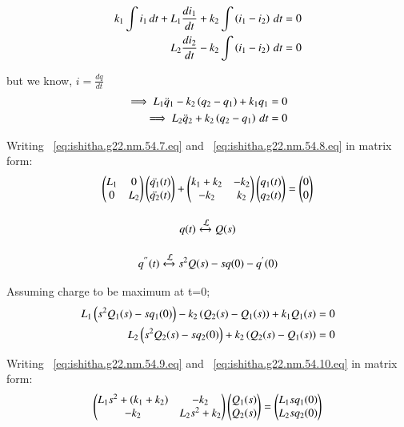 \documentclass[journal,12pt,twocolumn]{IEEEtran}
\theoremstyle{remark}
\begin{document}
\begin{align}
 k_1\int i_1 \, dt + L_1\frac{di_1}{dt}+k_2\int \left(i_1-i_2\right) \, dt &=0
\label{eq:ishitha.g22.nm.54.5.eq} \\
 L_2\frac{di_2}{dt}-k_2\int \left(i_1-i_2\right) \, dt &=0
\label{eq:ishitha.g22.nm.54.6.eq} 
\end{align}

but we know, $i=\frac{dq}{dt}$ 
 \begin{align}
 \implies L_1\ddot q_1 -k_2\left(q_2-q_1\right) + k_1q_1  &=0 
 \label{eq:ishitha.g22.nm.54.7.eq} \\
 \implies L_2\ddot q_2+k_2\left(q_2-q_1\right) \, dt &=0
  \label{eq:ishitha.g22.nm.54.8.eq}
\end{align}  


Writing ~\eqref{eq:ishitha.g22.nm.54.7.eq} and ~\eqref{eq:ishitha.g22.nm.54.8.eq} in matrix form:
\begin{align}
\begin{pmatrix}
L_1 & 0  \\
0 & L_2
\end{pmatrix}
\begin{pmatrix}
\ddot{q_1}(t) \\
\ddot{q_2}(t)
\end{pmatrix}
+
\begin{pmatrix}
k_1+k_2 & -k_2  \\
-k_2 & k_2
\end{pmatrix}
\begin{pmatrix}
q_1(t) \\
q_2(t)
\end{pmatrix}
=
\begin{pmatrix}
0 \\
0
\end{pmatrix}
\end{align}

\begin{equation}
q(t)     \stackrel{}{\xleftrightarrow{\mathcal{L}}}   Q(s)  
\end{equation}


\begin{equation}
q^{''}(t) \stackrel{}{\xleftrightarrow{\mathcal{L}}} s^{2}Q(s)-sq(0)-q^{'}(0)
\end{equation}

Assuming charge to be maximum at t=0;
\begin{align}
L_1\left(s^2Q_1(s)-sq_1(0)\right) - k_2\left(Q_2(s)-Q_1(s)\right) + k_1Q_1(s) &= 0
\label{eq:ishitha.g22.nm.54.9.eq} \\
L_2\left(s^2Q_2(s)-sq_2(0)\right) + k_2\left(Q_2(s)-Q_1(s)\right)&=0
\label{eq:ishitha.g22.nm.54.10.eq} 
\end{align}

Writing ~\eqref{eq:ishitha.g22.nm.54.9.eq} and ~\eqref{eq:ishitha.g22.nm.54.10.eq} in matrix form:
\begin{align}
\begin{pmatrix}
L_1s^2 + \left(k_1+k_2\right) & -k_2  \\
-k_2& L_2s^2+k_2
\end{pmatrix}
\begin{pmatrix}
Q_1(s) \\
Q_2(s)
\end{pmatrix}
=
\begin{pmatrix}
L_1sq_1(0) \\
L_2sq_2(0)
\end{pmatrix}
\end{align}
\end{document}
